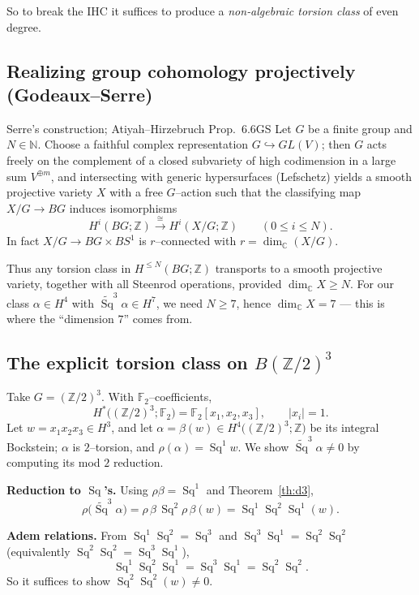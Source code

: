 \documentclass{article}
\newcommand{\C}{{\mathbb{C}}}
\newcommand{\F}{{\mathbb{F}}}
\newcommand{\Z}{{\mathbb{Z}}}
\DeclareMathOperator{\Sq}{Sq}
\begin{document}
So to break the IHC it suffices to produce a \emph{non‑algebraic torsion class} of
even degree.

\subsection{Realizing group cohomology projectively (Godeaux--Serre)}

\begin{thm}{Serre's construction; Atiyah--Hirzebruch Prop.~6.6}{GS}
Let $G$ be a finite group and $N\in\mathbb N$. Choose a faithful complex
representation $G\hookrightarrow GL(V)$; then $G$ acts freely on the complement of
a closed subvariety of high codimension in a large sum $V^{\oplus m}$, and
intersecting with generic hypersurfaces (Lefschetz) yields a smooth projective
variety $X$ with a free $G$--action such that the classifying map
$X/G\to BG$ induces isomorphisms
\[
  H^i(BG;\Z)\xrightarrow{\ \cong\ }H^i(X/G;\Z)\qquad(0\le i\le N).
\]
In fact $X/G\to BG\times BS^1$ is $r$--connected with $r=\dim_\C(X/G)$.
\end{thm}

Thus any torsion class in $H^{\le N}(BG;\Z)$ transports to a smooth projective
variety, together with all Steenrod operations, provided $\dim_\C X\ge N$. For our
class $\alpha\in H^4$ with $\widetilde{\Sq}^3\alpha\in H^7$, we need $N\ge 7$,
hence $\dim_\C X=7$ --- this is where the ``dimension $7$'' comes from.

\subsection{The explicit torsion class on $B(\Z/2)^3$}

Take $G=(\Z/2)^3$. With $\F_2$--coefficients,
\[
  H^*\!\big((\Z/2)^3;\F_2\big)=\F_2[x_1,x_2,x_3],\qquad |x_i|=1 .
\]
Let $w=x_1x_2x_3\in H^3$, and let $\alpha=\beta(w)\in H^4\big((\Z/2)^3;\Z\big)$ be
its integral Bockstein; $\alpha$ is $2$--torsion, and $\rho(\alpha)=\Sq^1 w$. We
show $\widetilde{\Sq}^3\alpha\neq 0$ by computing its mod $2$ reduction.

\smallskip\noindent\textbf{Reduction to $\Sq$'s.} Using $\rho\beta=\Sq^1$ and
Theorem~\ref{th:d3},
\[
  \rho\big(\widetilde{\Sq}^3\alpha\big)
  =\rho\,\beta\,\Sq^2\rho\,\beta(w)
  =\Sq^1\Sq^2\Sq^1(w).
\]

\smallskip\noindent\textbf{Adem relations.} From $\Sq^1\Sq^2=\Sq^3$ and
$\Sq^3\Sq^1=\Sq^2\Sq^2$ (equivalently $\Sq^2\Sq^2=\Sq^3\Sq^1$),
\[
  \Sq^1\Sq^2\Sq^1=\Sq^3\Sq^1=\Sq^2\Sq^2 .
\]
So it suffices to show $\Sq^2\Sq^2(w)\neq 0$.
\end{document}
